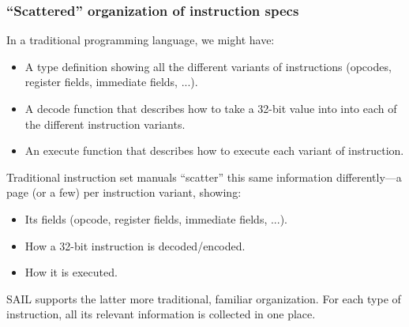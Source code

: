 \documentclass[aspectratio=169]{beamer}
\newcommand{\slidefont}{\scriptsize}
\begin{document}
\begin{frame}[fragile]
  \frametitle{``Scattered'' organization of instruction specs}

  \slidefont

  In a traditional programming language, we might have:
  \begin{itemize}
  \item A type definition showing all the different variants of
      instructions (opcodes, register fields, immediate fields, ...).

    \item A decode function that describes how to take a 32-bit value
      into into each of the different instruction variants.

    \item An execute function that describes how to execute each variant of instruction.
  \end{itemize}

  \vspace{1ex}

  Traditional instruction set manuals ``scatter'' this same
  information differently---a page (or a few) per instruction variant,
  showing:

  \begin{itemize}
    \item Its fields (opcode, register fields, immediate fields, ...).
    \item How a 32-bit instruction is decoded/encoded.
    \item How it is executed.
  \end{itemize}

  \vspace{1ex}

  SAIL supports the latter more traditional, familiar organization.
  For each type of instruction, all its relevant information is
  collected in one place.

\end{frame}

\end{document}
